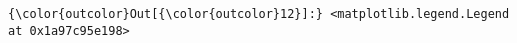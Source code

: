 \documentclass[11pt]{article}
\begin{document}
\begin{Verbatim}[fontsize=\small, commandchars=\\\{\}]
{\color{outcolor}Out[{\color{outcolor}12}]:} <matplotlib.legend.Legend at 0x1a97c95e198>
\end{Verbatim}
            
    \begin{center}
    \end{center}
    { \hspace*{\fill} \\}
    

    
    
    
    
\end{document}
